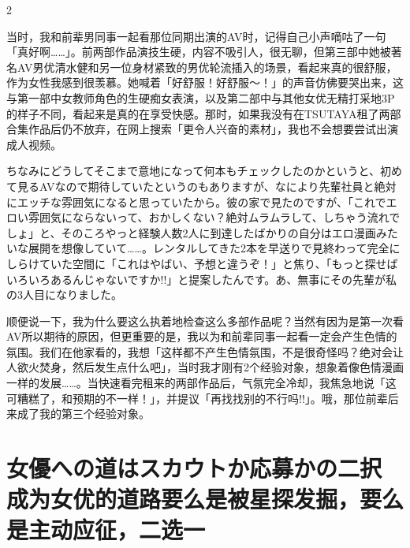 \documentclass[12pt,UTF8]{ctexbook}
\begin{document}
\begin{paracol}{2}
\switchcolumn

当时，我和前辈男同事一起看那位同期出演的AV时，记得自己小声嘀咕了一句「真好啊……」。前两部作品演技生硬，内容不吸引人，很无聊，但第三部中她被著名AV男优清水健和另一位身材紧致的男优轮流插入的场景，看起来真的很舒服，作为女性我感到很羡慕。她喊着「好舒服！好舒服～！」的声音仿佛要哭出来，这与第一部中女教师角色的生硬痴女表演，以及第二部中与其他女优无精打采地3P的样子不同，看起来是真的在享受快感。那时，如果我没有在TSUTAYA租了两部合集作品后仍不放弃，在网上搜索「更令人兴奋的素材」，我也不会想要尝试出演成人视频。

\switchcolumn*

ちなみにどうしてそこまで意地になって何本もチェックしたのかというと、初めて見るAVなので期待していたというのもありますが、なにより先輩社員と絶対にエッチな雰囲気になると思っていたから。彼の家で見たのですが、「これでエロい雰囲気にならないって、おかしくない？絶対ムラムラして、しちゃう流れでしょ」と、そのころやっと経験人数2人に到達したばかりの自分はエロ漫画みたいな展開を想像していて……。レンタルしてきた2本を早送りで見終わって完全にしらけていた空間に「これはやばい、予想と違うぞ！」と焦り、「もっと探せばいろいろあるんじゃないですか!!」と提案したんです。あ、無事にその先輩が私の3人目になりました。

\switchcolumn

顺便说一下，我为什么要这么执着地检查这么多部作品呢？当然有因为是第一次看AV所以期待的原因，但更重要的是，我以为和前辈同事一起看一定会产生色情的氛围。我们在他家看的，我想「这样都不产生色情氛围，不是很奇怪吗？绝对会让人欲火焚身，然后发生点什么吧」，当时我才刚有2个经验对象，想象着像色情漫画一样的发展……。当快速看完租来的两部作品后，气氛完全冷却，我焦急地说「这可糟糕了，和预期的不一样！」，并提议「再找找别的不行吗!!」。哦，那位前辈后来成了我的第三个经验对象。

\end{paracol}

\section{女優への道はスカウトか応募かの二択\\成为女优的道路要么是被星探发掘，要么是主动应征，二选一}
\end{document}

